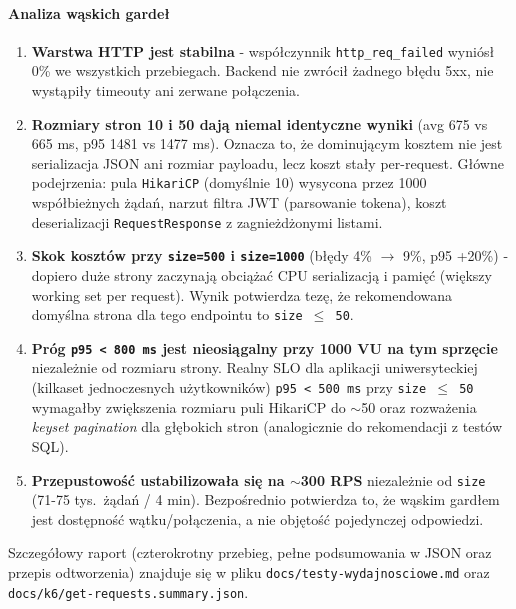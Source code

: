 \documentclass[12pt,a4paper]{article}
\begin{document}
\paragraph{Analiza wąskich gardeł}
\begin{enumerate}[leftmargin=*]
  \item \textbf{Warstwa HTTP jest stabilna} - współczynnik \texttt{http\_req\_failed}
        wyniósł 0\% we wszystkich przebiegach. Backend nie zwrócił żadnego błędu 5xx,
        nie wystąpiły timeouty ani zerwane połączenia.
  \item \textbf{Rozmiary stron 10 i 50 dają niemal identyczne wyniki}
        (avg 675 vs 665 ms, p95 1481 vs 1477 ms). Oznacza to, że dominującym
        kosztem nie jest serializacja JSON ani rozmiar payloadu, lecz koszt
        stały per-request. Główne podejrzenia: pula \texttt{HikariCP}
        (domyślnie 10) wysycona przez 1000 współbieżnych żądań, narzut filtra
        JWT (parsowanie tokena), koszt deserializacji \texttt{RequestResponse}
        z zagnieżdżonymi listami.
  \item \textbf{Skok kosztów przy \texttt{size=500} i \texttt{size=1000}}
        (błędy 4\% \(\to\) 9\%, p95 +20\%) - dopiero duże strony zaczynają
        obciążać CPU serializacją i pamięć (większy working set per request).
        Wynik potwierdza tezę, że rekomendowana domyślna strona dla tego
        endpointu to \texttt{size~\(\le\)~50}.
  \item \textbf{Próg \texttt{p95~<~800~ms} jest nieosiągalny przy 1000 VU
        na tym sprzęcie} niezależnie od rozmiaru strony. Realny SLO dla
        aplikacji uniwersyteckiej (kilkaset jednoczesnych użytkowników)
        \texttt{p95~<~500~ms} przy \texttt{size~\(\le\)~50} wymagałby
        zwiększenia rozmiaru puli HikariCP do \(\sim\)50 oraz rozważenia
        \emph{keyset pagination} dla głębokich stron (analogicznie do
        rekomendacji z testów SQL).
  \item \textbf{Przepustowość ustabilizowała się na \(\sim\)300 RPS} niezależnie
        od \texttt{size} (71-75 tys.\ żądań / 4 min). Bezpośrednio potwierdza
        to, że wąskim gardłem jest dostępność wątku/połączenia, a nie objętość
        pojedynczej odpowiedzi.
\end{enumerate}

Szczegółowy raport (czterokrotny przebieg, pełne podsumowania w JSON oraz
przepis odtworzenia) znajduje się w pliku \nolinkurl{docs/testy-wydajnosciowe.md}
oraz \nolinkurl{docs/k6/get-requests.summary.json}.
\end{document}
